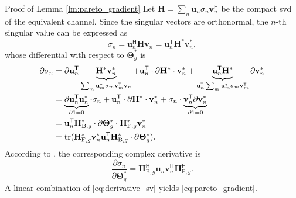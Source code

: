 \begin{appendix}
\begin{subsection}{Proof of Lemma \ref{lm:pareto_gradient}}\label{ap:pareto_gradient}
	Let $\mathbf{H} = \sum_n \mathbf{u}_n \sigma_n \mathbf{v}_n^\mathsf{H}$ be the compact \gls{svd} of the equivalent channel.
	Since the singular vectors are orthonormal, the $n$-th singular value can be expressed as
	\begin{equation}
		\sigma_n = \mathbf{u}_n^\mathsf{H} \mathbf{H} \mathbf{v}_n = \mathbf{u}_n^\mathsf{T} \mathbf{H}^* \mathbf{v}_n^*,
	\end{equation}
	whose differential with respect to $\mathbf{\Theta}_g^*$ is
	\begin{align*}
		\partial \sigma_n
		 & = \partial \mathbf{u}_n^\mathsf{T} \underbrace{\mathbf{H}^* \mathbf{v}_n^*}_{\sum_m \mathbf{u}_m^* \sigma_m \mathbf{v}_m^\mathsf{T} \mathbf{v}_n} + \mathbf{u}_n^\mathsf{T} \cdot \partial \mathbf{H}^* \cdot \mathbf{v}_n^* + \underbrace{\mathbf{u}_n^\mathsf{T} \mathbf{H}^*}_{\mathbf{u}_n^\mathsf{T} \sum_m \mathbf{u}_m^* \sigma_m \mathbf{v}_m^\mathsf{T}} \partial \mathbf{v}_n^* \\
		 & = \underbrace{\partial \mathbf{u}_n^\mathsf{T} \mathbf{u}_n^*}_{\partial 1 = 0} \cdot \sigma_n + \mathbf{u}_n^\mathsf{T} \cdot \partial \mathbf{H}^* \cdot \mathbf{v}_n^* + \sigma_n \cdot \underbrace{\mathbf{v}_n^\mathsf{T} \partial \mathbf{v}_n^*}_{\partial 1 = 0}                                                                                                                  \\
		 & = \mathbf{u}_n^\mathsf{T} \mathbf{H}_{\mathrm{B},g}^* \cdot \partial \mathbf{\Theta}_g^* \cdot \mathbf{H}_{\mathrm{F},g}^* \mathbf{v}_n^*                                                                                                                                                                                                                                                 \\
		 & = \operatorname{tr}(\mathbf{H}_{\mathrm{F},g}^* \mathbf{v}_n^*\mathbf{u}_n^\mathsf{T} \mathbf{H}_{\mathrm{B},g}^* \cdot \partial \mathbf{\Theta}_g^*).
	\end{align*}
	According to \cite{Hjorungnes2007}, the corresponding complex derivative is
	\begin{equation}
		\frac{\partial \sigma_n}{\partial \mathbf{\Theta}_g^*} = \mathbf{H}_{\mathrm{B},g}^\mathsf{H} \mathbf{u}_n \mathbf{v}_n^\mathsf{H} \mathbf{H}_{\mathrm{F},g}^\mathsf{H}.
		\label{eq:derivative_sv}
	\end{equation}
	A linear combination of \eqref{eq:derivative_sv} yields \eqref{eq:pareto_gradient}.
\end{subsection}



\end{appendix}
